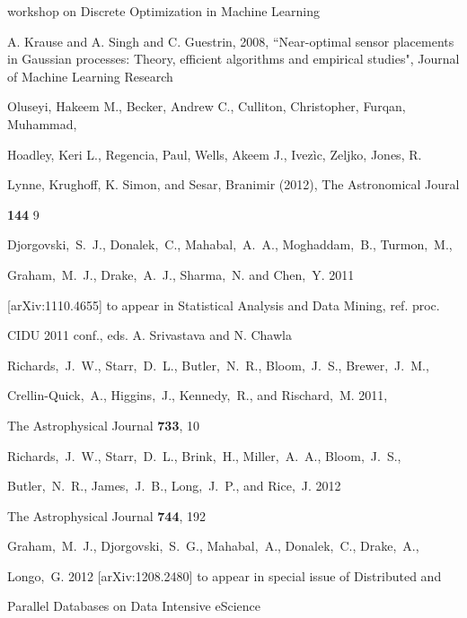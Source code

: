 \documentclass[prd,nofootbib,floatfix,11pt,tightenlines,nofootinbib]{revtex4}
\begin{document}
\begin{thebibliography}{99}
workshop on Discrete Optimization in Machine Learning



A. Krause and A. Singh and C. Guestrin, 2008, 
``Near-optimal sensor placements in Gaussian processes: Theory,
efficient algorithms and empirical studies",
Journal of Machine Learning Research

Oluseyi, Hakeem M., Becker, Andrew C., Culliton, Christopher, Furqan, Muhammad,

Hoadley, Keri L., Regencia, Paul, Wells, Akeem J., Ivez\`ic, Zeljko, Jones, R.

Lynne, Krughoff, K. Simon, and Sesar, Branimir (2012), The Astronomical Joural

{\bf 144} 9






Djorgovski,~S.~J., Donalek,~C., Mahabal,~A.~A., Moghaddam,~B., Turmon,~M.,

Graham,~M.~J., Drake,~A.~J., Sharma,~N. and Chen,~Y. 2011

[arXiv:1110.4655] to appear in Statistical Analysis and Data Mining, ref. proc.

CIDU 2011 conf., eds. A. Srivastava and N. Chawla




Richards,~J.~W., Starr,~D.~L., Butler,~N.~R., Bloom,~J.~S., Brewer,~J.~M.,

Crellin-Quick,~A., Higgins,~J., Kennedy,~R., and Rischard,~M. 2011,

The Astrophysical Journal {\bf 733}, 10




Richards,~J.~W., Starr,~D.~L., Brink,~H., Miller,~A.~A., Bloom,~J.~S.,

Butler,~N.~R., James,~J.~B., Long,~J.~P., and Rice,~J. 2012

The Astrophysical Journal {\bf 744}, 192




Graham,~M.~J., Djorgovski,~S.~G., Mahabal,~A., Donalek,~C., Drake,~A.,

Longo,~G. 2012 [arXiv:1208.2480] to appear in special issue of Distributed and

Parallel Databases on Data Intensive eScience




\end{thebibliography}
\end{document}
